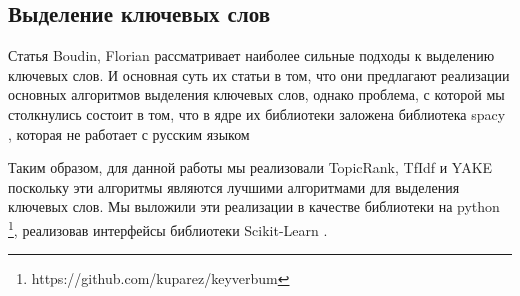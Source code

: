 \documentclass[aps,%
12pt,%
final,%
oneside,
onecolumn,%
musixtex, %
superscriptaddress,%
centertags]{article} %
\begin{document}
\subsection{Выделение ключевых слов}

Статья Boudin, Florian \cite{boudin:2016:COLINGDEMO} рассматривает наиболее сильные подходы к выделению ключевых слов.
И основная суть их статьи в том, что они предлагают реализации основных алгоритмов выделения ключевых слов, однако проблема,
с которой мы столкнулись состоит в том, что в ядре их библиотеки заложена библиотека spacy \cite{honnibal-johnson:2015:EMNLP}, которая не работает с русским языком

Таким образом, для данной работы мы реализовали TopicRank, TfIdf и YAKE поскольку эти алгоритмы являются лучшими алгоритмами для выделения ключевых слов. Мы выложили эти реализации в качестве библиотеки на python \footnote{https://github.com/kuparez/keyverbum}, реализовав интерфейсы библиотеки Scikit-Learn \cite{scikit-learn, sklearn_api}.

\end{document}
